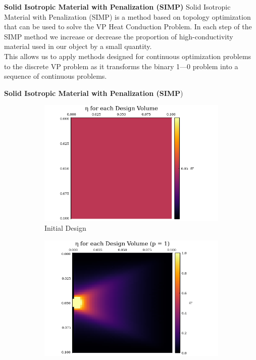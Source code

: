 \documentclass[final]{beamer}
\begin{document}
\begin{frame}{\textbf{Solid Isotropic Material with Penalization (SIMP)}}
	Solid Isotropic Material with Penalization (SIMP) is a method based on topology optimization that can be used to solve the VP Heat Conduction Problem.\vfill\pause
	In each step of the SIMP method we increase or decrease the proportion of high-conductivity material used in our object by a small quantity.\\\vfill This allows us to apply methods designed for continuous optimization problems to the discrete VP problem as it transforms the binary 1---0 problem into a sequence of continuous problems.
\end{frame}

\begin{frame}{\textbf{Solid Isotropic Material with Penalization (SIMP})}
	\begin{figure}
		\begin{subfigure}{0.45\linewidth}
			\includegraphics[width=\linewidth]{60x60-start-p=19-3iters.png}
			\caption{Initial Design}
		\end{subfigure}
		\begin{subfigure}{0.45\linewidth}
			\includegraphics[width=\linewidth]{60x60_1p.png}

\end{subfigure}
\end{figure}
\end{frame}
\end{document}
